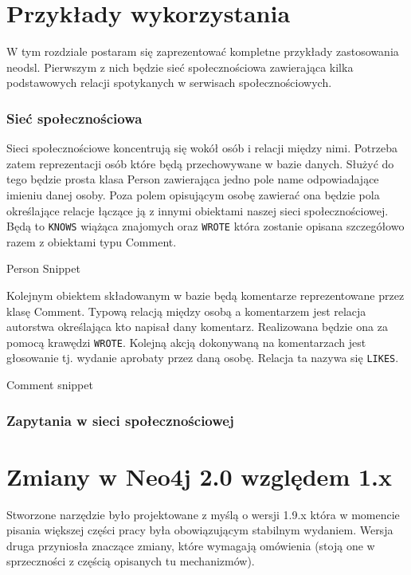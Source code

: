 \documentclass[brudnopis]{xmgr}
\begin{document}
\chapter{Przykłady wykorzystania}

W tym rozdziale postaram się zaprezentować kompletne przykłady zastosowania neodsl. Pierwszym z nich będzie sieć społecznościowa zawierająca kilka podstawowych relacji spotykanych w serwisach społecznościowych.

\subsection{Sieć społecznościowa}

Sieci społecznościowe koncentrują się wokół osób i relacji między nimi. Potrzeba zatem reprezentacji osób które będą przechowywane w bazie danych. Służyć do tego będzie prosta klasa Person zawierająca jedno pole name odpowiadające imieniu danej osoby. Poza polem opisującym osobę zawierać ona będzie pola określające relacje łączące ją z innymi obiektami naszej sieci społecznościowej. Będą to \texttt{KNOWS} wiążąca znajomych oraz \texttt{WROTE} która zostanie opisana szczegółowo razem z obiektami typu Comment.

Person Snippet

Kolejnym obiektem składowanym w bazie będą komentarze reprezentowane przez klasę Comment. Typową relacją między osobą a komentarzem jest relacja autorstwa określająca kto napisał dany komentarz. Realizowana będzie ona za pomocą krawędzi \texttt{WROTE}. Kolejną akcją dokonywaną na komentarzach jest głosowanie tj. wydanie aprobaty przez daną osobę. Relacja ta nazywa się \texttt{LIKES}.

Comment snippet

\subsection{Zapytania w sieci społecznościowej}

\chapter{Zmiany w Neo4j 2.0 względem 1.x}

Stworzone narzędzie było projektowane z myślą o wersji 1.9.x która w momencie pisania większej części pracy była obowiązującym stabilnym wydaniem. Wersja druga przyniosła znaczące zmiany, które wymagają omówienia (stoją one w sprzeczności z częścią opisanych tu mechanizmów).
\end{document}
